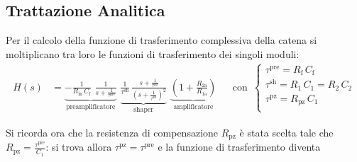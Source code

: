 \documentclass[a4paper,11pt]{article} %
\begin{document}

\subsection{Trattazione Analitica}\label{s:catena_th}

Per il calcolo della funzione di trasferimento complessiva della catena si moltiplicano tra loro le funzioni di
trasferimento dei singoli moduli: 
\begin{align}\label{e:catena_H} 
	H(s) &= 
	\underbrace{ -\frac{1}{R_{\text{in}}\,C_{\text{f}} } \,\, \frac{1}{ s + \frac{ 1 }{ \tau^{\text{pre}} } } }_\text{preamplificatore}
	\,\, 
	\underbrace{ \frac{ 1 }{ \tau^{ \text{sh} } }  \,  \frac{ s + \frac{1}{\tau^{\text{pz}}} }{ \left( s +
	\frac{1}{\tau^{ \text{sh} } } \right)^2} }_\text{shaper} 
	\,\, 
	\underbrace{ \left( 1 + \frac{R_{2\text{a}}}{R_{1\text{a}}} \right) }_\text{amplificatore}
   &
   &\text{con} \,\,\, 
   \begin{cases} 
		\tau^{\text{pre}} = R_{\text{f}}\,C_{\text{f}}  \\
       \tau^{\text{sh}} = R_{1}\,C_{1} = R_{2}\,C_{2}  \\
       \tau^{\text{pz}} = R_{\text{pz}}\,C_{1}         \\
   \end{cases} 
\end{align} 
   
Si ricorda ora che la resistenza di compensazione $R_{\text{pz}}$ è stata scelta tale che $R_{\text{pz}} =
\frac{\tau^{\text{pre}}}{C_{1}}$: si trova allora $\tau^{\text{pz}} = \tau^{\text{pre}}$ e la funzione di trasferimento
diventa 
\end{document}

